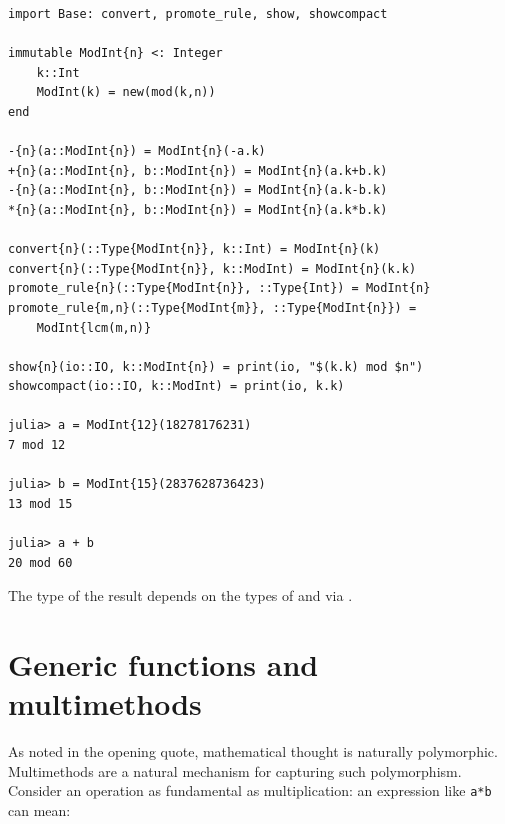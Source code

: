 \documentclass[pldi]{sigplanconf-pldi15}
\begin{document}
\begin{verbatim}
import Base: convert, promote_rule, show, showcompact

immutable ModInt{n} <: Integer
    k::Int
    ModInt(k) = new(mod(k,n))
end

-{n}(a::ModInt{n}) = ModInt{n}(-a.k)
+{n}(a::ModInt{n}, b::ModInt{n}) = ModInt{n}(a.k+b.k)
-{n}(a::ModInt{n}, b::ModInt{n}) = ModInt{n}(a.k-b.k)
*{n}(a::ModInt{n}, b::ModInt{n}) = ModInt{n}(a.k*b.k)

convert{n}(::Type{ModInt{n}}, k::Int) = ModInt{n}(k)
convert{n}(::Type{ModInt{n}}, k::ModInt) = ModInt{n}(k.k)
promote_rule{n}(::Type{ModInt{n}}, ::Type{Int}) = ModInt{n}
promote_rule{m,n}(::Type{ModInt{m}}, ::Type{ModInt{n}}) =
    ModInt{lcm(m,n)}

show{n}(io::IO, k::ModInt{n}) = print(io, "$(k.k) mod $n")
showcompact(io::IO, k::ModInt) = print(io, k.k)

julia> a = ModInt{12}(18278176231)
7 mod 12

julia> b = ModInt{15}(2837628736423)
13 mod 15

julia> a + b
20 mod 60
\end{verbatim}

The type of the result  depends on the types of  and
 via .



\section{Generic functions and multimethods}

As \cite{Poincare1908} noted in the opening quote, mathematical thought is
naturally polymorphic.  Multimethods are a natural mechanism for capturing such
polymorphism.  Consider an operation as fundamental as multiplication: an
expression like \verb|a*b| can mean:
\end{document}
